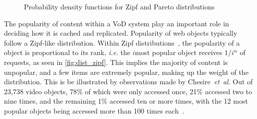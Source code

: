 \begin{figure}[t]
    \centering

    \qquad

    \caption
        {Probability density functions for Zipf and Pareto distributions}
    \label{fig:dist}
\end{figure}



    The popularity of content within a VoD system play an important role in deciding how it is cached and replicated. Popularity of web objects typically follow a Zipf-like distribution. Within Zipf distributions~\cite{zipf1949hbp}, the popularity of a object is proportional to its rank, \emph{i.e.} the $i$\sth most popular object receives $1/i^\alpha$ of requests, as seen in \autoref{fig:dist_zipf}. This implies the majority of content is unpopular, and a few items are extremely popular, making up the weight of the distribution. This is be illustrated by observations made by Chesire~\emph{et~al}. Out of 23,738 video objects, 78\% of which were only accessed once, 21\% accessed two to nine times, and the remaining 1\% accessed ten or more times, with the 12 most popular objects being accessed more than 100 times each~\cite{chesire2001maa}.


